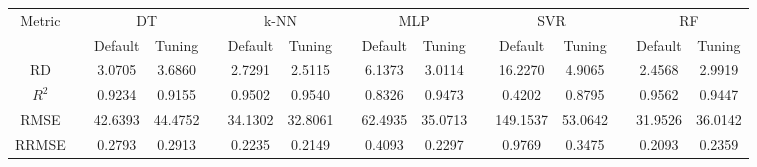 \begin{table}[!htbp]
	\setlength{\tabcolsep}{3pt}
	\begin{tabular}{cccccccccccccccc}
		\toprule
		\multirow{2}{*}{Metric} & & \multicolumn{2}{c}{DT} & & \multicolumn{2}{c}{k-NN} & & \multicolumn{2}{c}{MLP} & & \multicolumn{2}{c}{SVR} & & \multicolumn{2}{c}{RF}\\
		 \cline{3-4} \cline{6-7} \cline{9-10} \cline{12-13} \cline{15-16}
		  & & Default & Tuning & & Default & Tuning & & Default & Tuning & & Default & Tuning & & Default & Tuning\\
		\midrule
		RD & & 3.0705 & 3.6860 & & 2.7291 & 2.5115 & & 6.1373 & 3.0114 & & 16.2270 & 4.9065 & & 2.4568 & 2.9919\\
		$R^2$ & & 0.9234 & 0.9155 & & 0.9502 & 0.9540 & & 0.8326 & 0.9473 & & 0.4202 & 0.8795 & & 0.9562 & 0.9447\\
		RMSE & & 42.6393 & 44.4752 & & 34.1302 & 32.8061 & & 62.4935 & 35.0713 & & 149.1537 & 53.0642 & & 31.9526 & 36.0142\\
		RRMSE & & 0.2793 & 0.2913 & & 0.2235 & 0.2149 & & 0.4093 & 0.2297 & & 0.9769 & 0.3475 & & 0.2093 & 0.2359\\
		\bottomrule
	\end{tabular}
\end{table}
